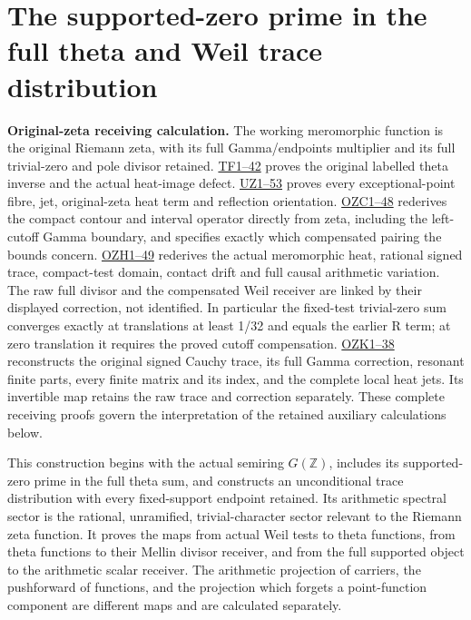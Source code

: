 \documentclass[
  10pt,
  a4paper,
]{article}
\author{}
\date{}
\begin{document}
{
\setcounter{tocdepth}{3}
\tableofcontents
}
\section{The supported-zero prime in the full theta and Weil trace
distribution}\label{the-supported-zero-prime-in-the-full-theta-and-weil-trace-distribution}

\textbf{Original-zeta receiving calculation.} The working meromorphic
function is the original Riemann zeta, with its full Gamma/endpoints
multiplier and its full trivial-zero and pole divisor retained.
\href{FAITHFUL_THETA_COMPLETION_RETURN.md}{TF1--42} proves the original
labelled theta inverse and the actual heat-image defect.
\href{FAITHFUL_UNCOMPLETED_ZETA_HEAT.md}{UZ1--53} proves every
exceptional-point fibre, jet, original-zeta heat term and reflection
orientation.
\href{ORIGINAL_ZETA_COMPACT_WEIL_RECONSTRUCTION.md}{OZC1--48} rederives
the compact contour and interval operator directly from zeta, including
the left-cutoff Gamma boundary, and specifies exactly which compensated
pairing the bounds concern.
\href{ORIGINAL_ZETA_HEAT_CONTACT_RECONSTRUCTION.md}{OZH1--49} rederives
the actual meromorphic heat, rational signed trace, compact-test domain,
contact drift and full causal arithmetic variation. The raw full divisor
and the compensated Weil receiver are linked by their displayed
correction, not identified. In particular the fixed-test trivial-zero
sum converges exactly at translations at least 1/32 and equals the
earlier R term; at zero translation it requires the proved cutoff
compensation. \href{ORIGINAL_ZETA_CAUCHY_RECONSTRUCTION.md}{OZK1--38}
reconstructs the original signed Cauchy trace, its full Gamma
correction, resonant finite parts, every finite matrix and its index,
and the complete local heat jets. Its invertible map retains the raw
trace and correction separately. These complete receiving proofs govern
the interpretation of the retained auxiliary calculations below.

This construction begins with the actual semiring \(G(\mathbb Z)\),
includes its supported-zero prime in the full theta sum, and constructs
an unconditional trace distribution with every fixed-support endpoint
retained. Its arithmetic spectral sector is the rational, unramified,
trivial-character sector relevant to the Riemann zeta function. It
proves the maps from actual Weil tests to theta functions, from theta
functions to their Mellin divisor receiver, and from the full supported
object to the arithmetic scalar receiver. The arithmetic projection of
carriers, the pushforward of functions, and the projection which forgets
a point-function component are different maps and are calculated
separately.
\end{document}

